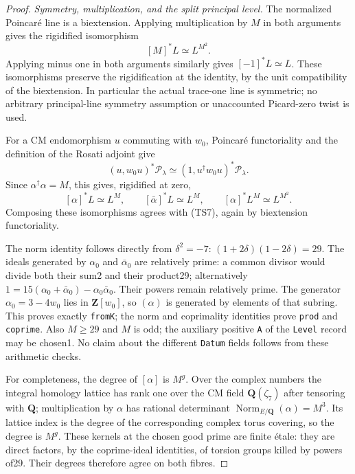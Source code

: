 \begin{proof}
\emph{Symmetry, multiplication, and the split principal level.}
The normalized Poincaré line is a biextension. Applying multiplication by \(M\) in both arguments gives the rigidified isomorphism \[
 [M]^*L\simeq L^{M^2}.
 \tag{TS7}
\] Applying minus one in both arguments similarly gives \([-1]^*L\simeq L\). These isomorphisms preserve the rigidification at the identity, by the unit compatibility of the biextension. In particular the actual trace-one line is symmetric; no arbitrary principal-line symmetry assumption or unaccounted Picard-zero twist is used.

For a CM endomorphism \(u\) commuting with \(w_0\), Poincaré functoriality and the definition of the Rosati adjoint give \[
 (u,w_0u)^*\mathcal P_\lambda
 \simeq (1,u^\dagger w_0u)^*\mathcal P_\lambda.
\] Since \(\alpha^\dagger\alpha=M\), this gives, rigidified at zero, \[
 [\alpha]^*L\simeq L^M,
 \qquad [\bar\alpha]^*L\simeq L^M,
 \qquad [\alpha]^*L^M\simeq L^{M^2}.
 \tag{TS8}
\] Composing these isomorphisms agrees with (TS7), again by biextension functoriality.

The norm identity follows directly from \(\delta^2=-7\): \((1+2\delta)(1-2\delta)=29\). The ideals generated by \(\alpha_0\) and \(\bar\alpha_0\) are relatively prime: a common divisor would divide both their sum2 and their product29; alternatively \(1=15(\alpha_0+\bar\alpha_0)-\alpha_0\bar\alpha_0\). Their powers remain relatively prime. The generator \(\alpha_0=3-4w_0\) lies in \(\mathbf Z[w_0]\), so \((\alpha)\) is generated by elements of that subring. This proves exactly \texttt{fromK}; the norm and coprimality identities prove \texttt{prod} and \texttt{coprime}. Also \(M\ge29\) and \(M\) is odd; the auxiliary positive \texttt{A} of the \texttt{Level} record may be chosen1. No claim about the different \texttt{Datum} fields follows from these arithmetic checks.

For completeness, the degree of \([\alpha]\) is \(M^g\). Over the complex numbers the integral homology lattice has rank one over the CM field \(\mathbf Q(\zeta_7)\) after tensoring with \(\mathbf Q\); multiplication by \(\alpha\) has rational determinant \(\operatorname{Norm}_{E/\mathbf Q}(\alpha)=M^3\). Its lattice index is the degree of the corresponding complex torus covering, so the degree is \(M^g\). These kernels at the chosen good prime are finite étale: they are direct factors, by the coprime-ideal identities, of torsion groups killed by powers of29. Their degrees therefore agree on both fibres.


\end{proof}
